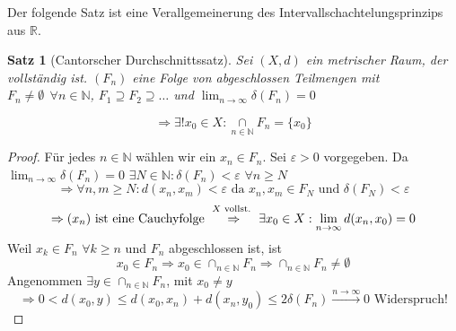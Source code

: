\documentclass[ngerman]{report}
\theoremstyle{plain}%
\newtheorem{thm}{Satz}[chapter]
\theoremstyle{definition}%
\theoremstyle{myStyle}
\newcommand{\R}{\mathbb{R}}
\newcommand{\N}{\mathbb{N}}
\newcommand{\df}[1][]{%
	\overset{#1}{\Rightarrow}
}
\newcommand{\limes}[1][\infty]{\lim_{n \to #1}}
\begin{document}
Der folgende Satz ist eine Verallgemeinerung des Intervallschachtelungsprinzips aus $\R$.
\begin{thm}[Cantorscher Durchschnittssatz]
	Sei $(X,d)$ ein metrischer Raum, der vollständig ist. $(F_n)$ eine Folge von 		abgeschlossen Teilmengen mit $F_n \not = \emptyset\;\, \forall n\in\N$, 			$F_1\supseteq F_2\supseteq \dots$ und $\displaystyle \lim_{n\to\infty} \delta(F_n)=0$\par 
	$$\df \exists! x_0\in X: \underset{n\in\N}{\cap}F_n = \{x_0\}$$
\end{thm}
\begin{proof}
	Für jedes $n\in\N$ wählen wir ein $x_n\in F_n$. Sei $\varepsilon > 0$ vorgegeben. 
	Da $\displaystyle \lim_{n\to\infty} \delta(F_n)=0$ $\exists N\in\N:\delta(F_n)<\varepsilon$ $\forall n \geq N$
	$$\df \forall n,m\geq N: d(x_n,x_m)<\varepsilon \text{ da } x_n,x_m\in F_N \text{ und } \delta(F_N)<\varepsilon$$
	$$\df (x_n) \text{ ist eine Cauchyfolge } \overset{ X \text{ vollst. }}{\df} \exists x_0\in X : \limes d(x_n,x_0) = 0$$
	Weil $x_k\in F_n$  $\forall k \geq n$ und $F_n$ abgeschlossen ist, ist $$ x_0 \in F_n\df x_0 \in \cap_{n\in\N}F_n \df \cap_{n\in\N} F_n \not = \emptyset$$
	Angenommen $\exists y\in \cap_{n\in\N} F_n$, mit $x_0 \not= y$
	$$\df 0 < d(x_0,y) \leq d(x_0,x_n) + d(x_n,y_0) \leq 2\delta(F_n)\overset{n\to\infty}{\longrightarrow} 0 \text{  Widerspruch!}$$
\end{proof}

\end{document}
